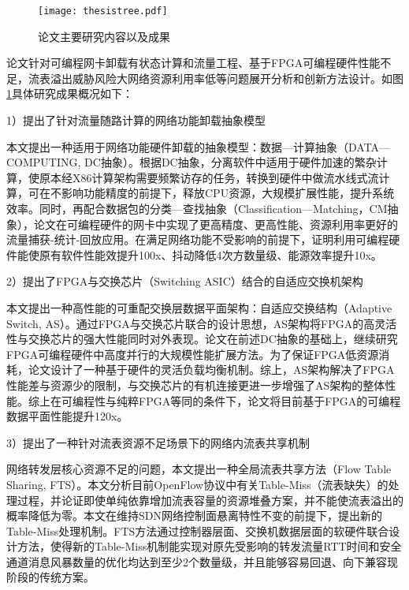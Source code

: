 \begin{figure}[!ht]
	\centering
	\texttt{[image: thesistree.pdf]}
	\caption{论文主要研究内容以及成果} \label{thesistree}
\end{figure}

论文针对可编程网卡卸载有状态计算和流量工程、基于FPGA可编程硬件性能不足，流表溢出威胁风险大网络资源利用率低等问题展开分析和创新方法设计。如图\ref{thesistree}具体研究成果概况如下：

1）提出了针对流量随路计算的网络功能卸载抽象模型

本文提出一种适用于网络功能硬件卸载的抽象模型：数据—计算抽象（DATA—COMPUTING, DC抽象）。根据DC抽象，分离软件中适用于硬件加速的繁杂计算，使原本经X86计算架构需要频繁访存的任务，转换到硬件中做流水线式流计算，可在不影响功能精度的前提下，释放CPU资源，大规模扩展性能，提升系统效率。同时，再配合数据包的分类—查找抽象（Classification—Matching，CM抽象），论文在可编程硬件的网卡中实现了更高精度、更高性能、资源利用率更好的流量捕获-统计-回放应用。在满足网络功能不受影响的前提下，证明利用可编程硬件能使原有软件性能效提升100x、抖动降低4次方数量级、能源效率提升10x。

2）提出了FPGA与交换芯片（Switching ASIC）结合的自适应交换机架构

本文提出一种高性能的可重配交换层数据平面架构：自适应交换结构（Adaptive Switch, AS）。通过FPGA与交换芯片联合的设计思想，AS架构将FPGA的高灵活性与交换芯片的强大性能同时对外表现。论文在前述DC抽象的基础上，继续研究FPGA可编程硬件中高度并行的大规模性能扩展方法。为了保证FPGA低资源消耗，论文设计了一种基于硬件的灵活负载均衡机制。综上，AS架构解决了FPGA性能差与资源少的限制，与交换芯片的有机连接更进一步增强了AS架构的整体性能。综上在可编程性与纯粹FPGA等同的条件下，论文将目前基于FPGA的可编程数据平面性能提升120x。


3）提出了一种针对流表资源不足场景下的网络内流表共享机制

网络转发层核心资源不足的问题，本文提出一种全局流表共享方法（Flow Table Sharing, FTS）。本文分析目前OpenFlow协议中有关Table-Miss（流表缺失）的处理过程，并论证即使单纯依靠增加流表容量的资源堆叠方案，并不能使流表溢出的概率降低为零。本文在维持SDN网络控制面悬离特性不变的前提下，提出新的Table-Miss处理机制。FTS方法通过控制器层面、交换机数据层面的软硬件联合设计方法，使得新的Table-Miss机制能实现对原先受影响的转发流量RTT时间和安全通道消息风暴数量的优化均达到至少2个数量级，并且能够容易回退、向下兼容现阶段的传统方案。


